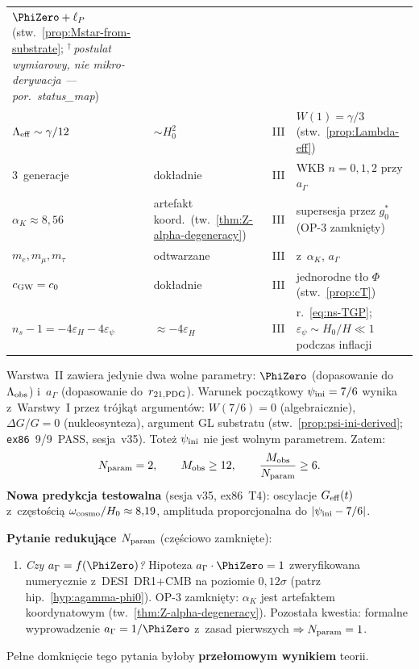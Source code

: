 \begin{table}[h!]
\begin{tabular}{@{}llll@{}}
  $\PhiZero + \ell_P$ (stw.~\ref{prop:Mstar-from-substrate};
  $^{\dagger}$\,\emph{postulat wymiarowy, nie mikro-derywacja --- por.\ status\_map}) \\
$\Lambda_{\rm eff} \sim \gamma/12$ & $\sim H_0^2$ & III &
  $W(1) = \gamma/3$ (stw.~\ref{prop:Lambda-eff}) \\
3~generacje & dok\l{}adnie & III &
  WKB $n=0,1,2$ przy $a_\Gamma$ \\
$\alpha_K \approx 8{,}56$ & artefakt koord.\ (tw.~\ref{thm:Z-alpha-degeneracy}) & III &
  supersesja przez $g_0^*$ (OP-3 zamkni\k{e}ty) \\
$m_e, m_\mu, m_\tau$ & odtwarzane & III &
  z~$\alpha_K$, $a_\Gamma$ \\
$c_{\rm GW} = c_0$ & dok\l{}adnie & III &
  jednorodne t\l{}o $\Phi$ (stw.~\ref{prop:cT}) \\
$n_s - 1 = -4\varepsilon_H - 4\varepsilon_\psi$ & $\approx -4\varepsilon_H$ & III &
  r.~\eqref{eq:ns-TGP}; $\varepsilon_\psi \sim H_0/H \ll 1$ podczas inflacji \\
\bottomrule
\end{tabular}
\end{table}

\begin{remark}%
\label{rem:parsimony}
Warstwa~II zawiera jedynie dwa wolne parametry:
$\PhiZero$ (dopasowanie do~$\Lambda_{\rm obs}$) i~$a_\Gamma$
(dopasowanie do~$r_{21,\rm PDG}$).
Warunek pocz\k{a}tkowy $\psi_{\rm ini} = 7/6$ wynika z~Warstwy~I
przez tr\'ojk\k{a}t argument\'ow: $W(7/6)=0$ (algebraicznie),
$\Delta G/G = 0$ (nukleosynteza), argument GL substratu
(stw.~\ref{prop:psi-ini-derived}; \texttt{ex86}~9/9~PASS, sesja~v35).
Tote\.z $\psi_{\rm ini}$ nie jest wolnym parametrem.
Zatem:
\begin{equation}\label{eq:parsimony-N2}
  N_{\rm param} = 2,
  \qquad
  M_{\rm obs} \geq 12,
  \qquad
  \frac{M_{\rm obs}}{N_{\rm param}} \geq 6.
\end{equation}
\textbf{Nowa predykcja testowalna} (sesja v35, ex86~T4):
oscylacje $G_{\rm eff}(t)$ z~cz\k{e}sto\'sci\k{a}
$\omega_{\rm cosmo}/H_0 \approx 8{,}19$, amplituda
proporcjonalna do $|\psi_{\rm ini} - 7/6|$.

\medskip\noindent
\textbf{Pytanie redukuj\k{a}ce $N_{\rm param}$} (cz\k{e}\'sciowo zamkni\k{e}te):
\begin{enumerate}[nosep]
  \item \emph{Czy $a_\Gamma = f(\PhiZero)$?}
    Hipoteza $a_\Gamma \cdot \PhiZero = 1$ zweryfikowana numerycznie
    z~DESI~DR1+CMB na poziomie $0{,}12\sigma$ (patrz hip.~\ref{hyp:agamma-phi0}).
    OP-3 zamkni\k{e}ty: $\alpha_K$ jest artefaktem koordynatowym
    (tw.~\ref{thm:Z-alpha-degeneracy}).
    Pozosta\l{}a kwestia: formalne wyprowadzenie $a_\Gamma = 1/\PhiZero$
    z~zasad pierwszych $\Rightarrow N_{\rm param} = 1$.
\end{enumerate}
Pe\l{}ne domkni\k{e}cie tego pytania by\l{}oby
\textbf{prze\l{}omowym wynikiem} teorii.
\end{remark}


